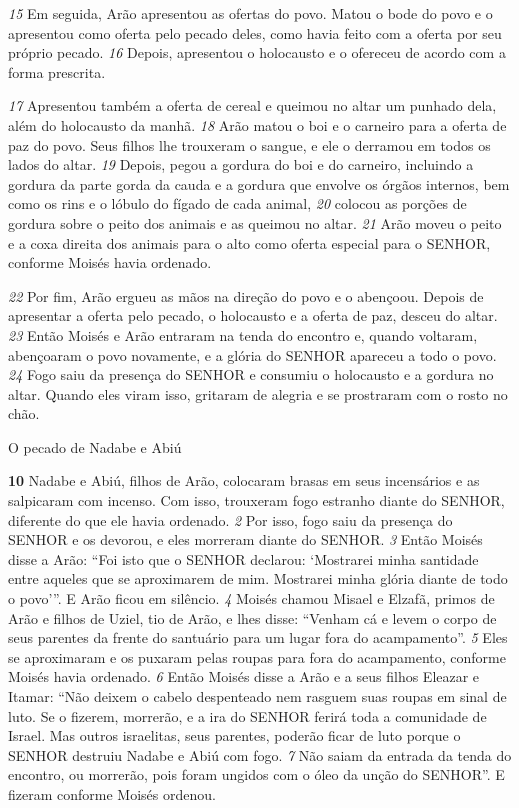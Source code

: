 \smallskip
\textit{\tiny 15}
Em seguida, Arão apresentou as ofertas do povo. Matou o bode do povo e o
apresentou como oferta pelo pecado deles, como havia feito com a oferta por seu
próprio pecado. 
\textit{\tiny 16}
Depois, apresentou o holocausto e o ofereceu de acordo com a
forma prescrita. 

\smallskip
\textit{\tiny 17}
Apresentou também a oferta de cereal e queimou no altar um
punhado dela, além do holocausto da manhã.
\textit{\tiny 18}
Arão matou o boi e o carneiro para a oferta de paz do povo. Seus filhos lhe
trouxeram o sangue, e ele o derramou em todos os lados do altar. 
\textit{\tiny 19}
Depois, pegou
a gordura do boi e do carneiro, incluindo a gordura da parte gorda da cauda e a
gordura que envolve os órgãos internos, bem como os rins e o lóbulo do fígado de
cada animal, 
\textit{\tiny 20}
colocou as porções de gordura sobre o peito dos animais e as
queimou no altar. 
\textit{\tiny 21}
Arão moveu o peito e a coxa direita dos animais para o alto
como oferta especial para o SENHOR, conforme Moisés havia ordenado.

\smallskip
\textit{\tiny 22}
Por fim, Arão ergueu as mãos na direção do povo e o abençoou. Depois de
apresentar a oferta pelo pecado, o holocausto e a oferta de paz, desceu do altar.
\textit{\tiny 23}
Então Moisés e Arão entraram na tenda do encontro e, quando voltaram,
abençoaram o povo novamente, e a glória do SENHOR apareceu a todo o povo.
\textit{\tiny 24}
Fogo saiu da presença do SENHOR e consumiu o holocausto e a gordura no altar.
Quando eles viram isso, gritaram de alegria e se prostraram com o rosto no chão.

\bigskip
O pecado de Nadabe e Abiú
   
\textbf{\large 10}
 Nadabe e Abiú, filhos de Arão, colocaram brasas em seus incensários e as
salpicaram com incenso. Com isso, trouxeram fogo estranho diante do SENHOR,
diferente do que ele havia ordenado. 
\textit{\tiny 2} 
Por isso, fogo saiu da presença do SENHOR e
os devorou, e eles morreram diante do SENHOR. 
\textit{\tiny 3} 
Então Moisés disse a Arão: “Foi isto que o SENHOR declarou:
    ‘Mostrarei minha santidade
      entre aqueles que se aproximarem de mim.
    Mostrarei minha glória
      diante de todo o povo’”.
E Arão ficou em silêncio. 
\textit{\tiny 4} 
Moisés chamou Misael e Elzafã, primos de Arão e filhos de Uziel, tio de Arão, e
lhes disse: “Venham cá e levem o corpo de seus parentes da frente do santuário
para um lugar fora do acampamento”. 
\textit{\tiny 5} 
Eles se aproximaram e os puxaram pelas
roupas para fora do acampamento, conforme Moisés havia ordenado. 
\textit{\tiny 6} 
Então Moisés disse a Arão e a seus filhos Eleazar e Itamar: “Não deixem o
cabelo despenteado
 nem rasguem suas roupas em sinal de luto. Se o fizerem,
morrerão, e a ira do SENHOR ferirá toda a comunidade de Israel. Mas outros
israelitas, seus parentes, poderão ficar de luto porque o SENHOR destruiu Nadabe e
Abiú com fogo. 
\textit{\tiny 7} 
Não saiam da entrada da tenda do encontro, ou morrerão, pois
foram ungidos com o óleo da unção do SENHOR”. E fizeram conforme Moisés
ordenou.

